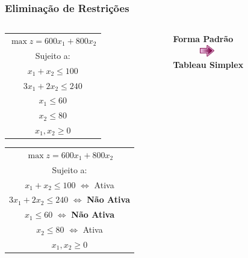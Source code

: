 \documentclass{beamer}
\begin{document}
\begin{frame}
	\frametitle{Eliminação de Restrições}
	\begin{columns}
		\begin{column}{5cm}
			\scriptsize
			\begin{table}
				{
					\begin{tabular}{c}
						\cellcolor{red!50} $ \max z = 600x_1 + 800x_2 $ \\
						\cellcolor{red!50} Sujeito a: \\
						\cellcolor{red!50} $x_1 + x_2 \le 100$ \\
						\cellcolor{red!50} $3x_1 + 2x_2 \le 240$ \\
						\cellcolor{red!50} $x_1 \le 60 $ \\
						\cellcolor{red!50} $x_2 \le 80 $ \\
					    \cellcolor{red!50} $x_1, x_2 \ge 0 $ \\
					\end{tabular}
				}
				{
					\begin{tabular}{c}
						\cellcolor{red!50} $ \max z = 600x_1 + 800x_2 $ \\
						\cellcolor{red!50} Sujeito a: \\
						\cellcolor{red!50} $x_1 + x_2 \le 100$ {\color{green} $\Leftrightarrow$ Ativa}\\
						\cellcolor{red!50} $3x_1 + 2x_2 \le 240$ {\color{green} $\Leftrightarrow$ \textbf{Não Ativa}}\\
						\cellcolor{red!50} $x_1 \le 60 $ {\color{green} $\Leftrightarrow$ \textbf{Não Ativa}}\\
						\cellcolor{red!50} $x_2 \le 80 $ {\color{green} $\Leftrightarrow$ Ativa}\\
					    \cellcolor{red!50} $x_1, x_2 \ge 0 $ \\
					\end{tabular}
				}
			\end{table}
		\end{column}
		\begin{column}{3cm}
			\centering
			\textbf{Forma Padrão} \\
			\includegraphics[width=3cm,height=0.5cm]{seta.png} \\
			\textbf{Tableau Simplex} \\
		\end{column}
		\begin{column}{4cm}

\end{column}
\end{columns}
\end{frame}
\end{document}
